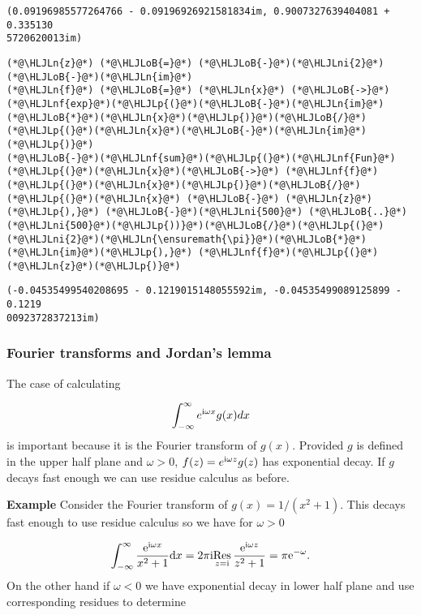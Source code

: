 \documentclass[12pt,a4paper]{article}
\newcommand{\HLJLn}[1]{#1}
\newcommand{\HLJLnf}[1]{\textcolor[RGB]{66,102,213}{#1}}
\newcommand{\HLJLni}[1]{\textcolor[RGB]{59,151,46}{#1}}
\newcommand{\HLJLoB}[1]{\textcolor[RGB]{102,102,102}{\textbf{#1}}}
\newcommand{\HLJLp}[1]{#1}
\def\D{ {\rm d} }
\def\I{ {\rm i} }
\def\E{ {\rm e} }
\def\Res_#1{\underset{#1}{\rm Res}\,}
\begin{document}
\begin{lstlisting}
(0.09196985577264766 - 0.09196926921581834im, 0.9007327639404081 + 0.335130
5720620013im)
\end{lstlisting}


\begin{lstlisting}
(*@\HLJLn{z}@*) (*@\HLJLoB{=}@*) (*@\HLJLoB{-}@*)(*@\HLJLni{2}@*)(*@\HLJLoB{-}@*)(*@\HLJLn{im}@*)
(*@\HLJLn{f}@*) (*@\HLJLoB{=}@*) (*@\HLJLn{x}@*) (*@\HLJLoB{->}@*) (*@\HLJLnf{exp}@*)(*@\HLJLp{(}@*)(*@\HLJLoB{-}@*)(*@\HLJLn{im}@*)(*@\HLJLoB{*}@*)(*@\HLJLn{x}@*)(*@\HLJLp{)}@*)(*@\HLJLoB{/}@*)(*@\HLJLp{(}@*)(*@\HLJLn{x}@*)(*@\HLJLoB{-}@*)(*@\HLJLn{im}@*)(*@\HLJLp{)}@*)
(*@\HLJLoB{-}@*)(*@\HLJLnf{sum}@*)(*@\HLJLp{(}@*)(*@\HLJLnf{Fun}@*)(*@\HLJLp{(}@*)(*@\HLJLn{x}@*)(*@\HLJLoB{->}@*) (*@\HLJLnf{f}@*)(*@\HLJLp{(}@*)(*@\HLJLn{x}@*)(*@\HLJLp{)}@*)(*@\HLJLoB{/}@*)(*@\HLJLp{(}@*)(*@\HLJLn{x}@*) (*@\HLJLoB{-}@*) (*@\HLJLn{z}@*)(*@\HLJLp{),}@*) (*@\HLJLoB{-}@*)(*@\HLJLni{500}@*) (*@\HLJLoB{..}@*) (*@\HLJLni{500}@*)(*@\HLJLp{))}@*)(*@\HLJLoB{/}@*)(*@\HLJLp{(}@*)(*@\HLJLni{2}@*)(*@\HLJLn{\ensuremath{\pi}}@*)(*@\HLJLoB{*}@*)(*@\HLJLn{im}@*)(*@\HLJLp{),}@*) (*@\HLJLnf{f}@*)(*@\HLJLp{(}@*)(*@\HLJLn{z}@*)(*@\HLJLp{)}@*)
\end{lstlisting}

\begin{lstlisting}
(-0.04535499540208695 - 0.1219015148055592im, -0.04535499089125899 - 0.1219
0092372837213im)
\end{lstlisting}


\subsubsection{Fourier transforms and Jordan's lemma}
The case of calculating

\[
    \int_{-\infty}^\infty e^{\I \omega x} g(x) dx
\]
is important because it is the Fourier transform of $g(x)$. Provided $g$ is defined in the upper half plane and $\omega > 0$, $f(z) = e^{\I \omega z} g(z)$  has exponential decay. If $g$ decays fast enough we can use residue calculus as before.

\textbf{Example} Consider the Fourier transform of $g(x) = 1/(x^2+1)$. This decays fast enough to use residue calculus so we have for $\omega > 0$

\[
\int_{-\infty}^\infty {\E^{\I \omega x } \over x^2 + 1} \D x = 2 \pi \I \Res_{z = \I} {\E^{\I \omega z } \over z^2 + 1} = \pi \E^{-\omega}.
\]
On the other hand if $\omega < 0$ we have exponential decay in lower half plane and use corresponding residues to determine
\end{document}
